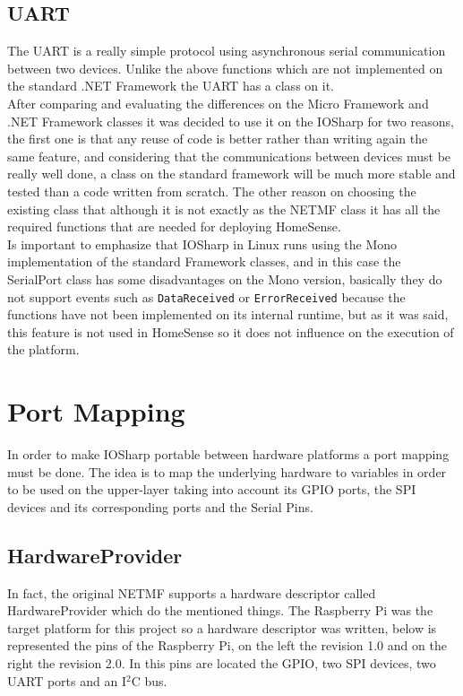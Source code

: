 \subsection{UART}\label{SS:IOSharp-UART}
The UART is a really simple protocol using asynchronous serial communication between two devices. Unlike the above functions which are not implemented on the standard .NET Framework the UART has a class on it.
\\
After comparing and evaluating the differences on the Micro Framework and .NET Framework classes it was decided to use it on the IOSharp for two reasons, the first one is that any reuse of code is better rather than writing again the same feature, and considering that the communications between devices must be really well done, a class on the standard framework will be much more stable and tested than a code written from scratch. The other reason on choosing the existing class that although it is not exactly as the NETMF class it has all the required functions that are needed for deploying HomeSense.
\\
Is important to emphasize that IOSharp in Linux runs using the Mono implementation of the standard Framework classes, and in this case the SerialPort class has some disadvantages on the Mono version, basically they do not support events such as \verb!DataReceived! or \verb!ErrorReceived! because the functions have not been implemented on its internal runtime, but as it was said, this feature is not used in HomeSense so it does not influence on the execution of the platform.

\section{Port Mapping}\label{S:Port-Mapping}
In order to make IOSharp portable between hardware platforms a port mapping must be done. The idea is to map the underlying hardware to variables in order to be used on the upper-layer taking into account its GPIO ports, the SPI devices and its corresponding ports and the Serial Pins.

\subsection{HardwareProvider}\label{SS:HardwareProvider}
In fact, the original NETMF supports a hardware descriptor called HardwareProvider which do the mentioned things. The Raspberry Pi was the target platform for this project so a hardware descriptor was written, below is represented the pins of the Raspberry Pi, on the left the revision 1.0 and on the right the revision 2.0. In this pins are located the GPIO, two SPI devices, two UART ports and an I$^{2}$C bus.

